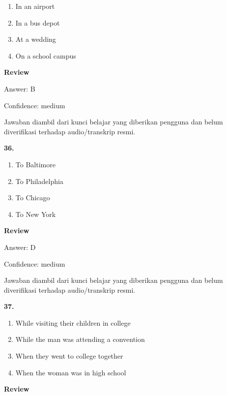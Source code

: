 \documentclass[12pt]{article}
\begin{document}
\begin{enumerate}[label=(\Alph*),leftmargin=*,itemsep=0.2em]
\item In an airport
\item In a bus depot
\item At a wedding
\item On a school campus
\end{enumerate}
\par
\begingroup
\setlength{\parskip}{0pt}
\setlength{\parindent}{0pt}
\textbf{Review}\par
Answer: B\par
Confidence: medium\par
Jawaban diambil dari kunci belajar yang diberikan pengguna dan belum diverifikasi terhadap audio/transkrip resmi.\par
\endgroup
\par
\vspace{0.25\baselineskip}
\noindent\textbf{36.}
\begin{enumerate}[label=(\Alph*),leftmargin=*,itemsep=0.2em]
\item To Baltimore
\item To Philadelphia
\item To Chicago
\item To New York
\end{enumerate}
\par
\begingroup
\setlength{\parskip}{0pt}
\setlength{\parindent}{0pt}
\textbf{Review}\par
Answer: D\par
Confidence: medium\par
Jawaban diambil dari kunci belajar yang diberikan pengguna dan belum diverifikasi terhadap audio/transkrip resmi.\par
\endgroup
\par
\vspace{0.25\baselineskip}
\noindent\textbf{37.}
\begin{enumerate}[label=(\Alph*),leftmargin=*,itemsep=0.2em]
\item While visiting their children in college
\item While the man was attending a convention
\item When they went to college together
\item When the woman was in high school
\end{enumerate}
\par
\begingroup
\setlength{\parskip}{0pt}
\setlength{\parindent}{0pt}
\textbf{Review}\par
\end{document}
